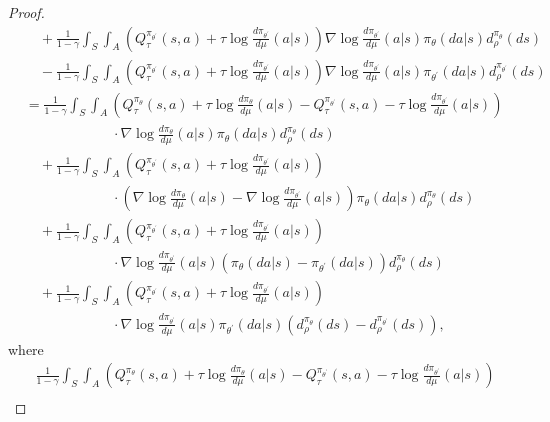 \documentclass{amsart}
\theoremstyle{definition}
\begin{document}
\begin{proof}
\begin{align}
& \quad + \frac{1}{1-\gamma}\int_{S} \int_{A} \left(Q^{\pi_{\theta^\prime}}_\tau(s,a) + \tau \log \frac{d \pi_{\theta^\prime}}{d \mu}(a|s)\right)  \nabla \log \frac{d\pi_{\theta^\prime}}{d \mu}(a| s)\pi_{\theta}(da|s)d_\rho^{\pi_{\theta}}(ds) \nonumber\\
& \quad - \frac{1}{1-\gamma}\int_{S} \int_{A} \left(Q^{\pi_{\theta^\prime}}_\tau(s,a) + \tau \log \frac{d \pi_{\theta^\prime}}{d \mu}(a|s)\right)  \nabla \log \frac{d\pi_{\theta^\prime}}{d \mu}(a| s)\pi_{\theta^\prime}(da|s)d_\rho^{\pi_{\theta^\prime}}(ds) \nonumber\\
& = \frac{1}{1-\gamma}\int_{S} \int_{A} \left(Q^{\pi_\theta}_\tau(s,a) + \tau \log \frac{d \pi_{\theta}}{d \mu}(a|s) - Q^{\pi_{\theta^\prime}}_\tau(s,a) - \tau \log \frac{d \pi_{\theta^\prime}}{d \mu}(a|s)\right) \nonumber \\
& \qquad \qquad \qquad \ \cdot\nabla \log \frac{d\pi_\theta}{d \mu}(a| s)\pi_{\theta}(da|s)d_\rho^{\pi_{\theta}}(ds) \nonumber \\
& \quad + \frac{1}{1-\gamma}\int_{S} \int_{A} \left(Q^{\pi_{\theta^\prime}}_\tau(s,a) + \tau \log \frac{d \pi_{\theta^\prime}}{d \mu}(a|s)\right) \nonumber \\
& \qquad \qquad \qquad \ \cdot\left(\nabla \log \frac{d\pi_{\theta}}{d \mu}(a| s) - \nabla \log \frac{d\pi_{\theta^\prime}}{d \mu}(a| s)\right)\pi_{\theta}(da|s)d_\rho^{\pi_{\theta}}(ds) \nonumber\\
& \quad + \frac{1}{1-\gamma}\int_{S} \int_{A} \left(Q^{\pi_{\theta^\prime}}_\tau(s,a) + \tau \log \frac{d \pi_{\theta^\prime}}{d \mu}(a|s)\right)  \nonumber \\
& \qquad \qquad \qquad \ \cdot \nabla \log \frac{d\pi_{\theta^\prime}}{d \mu}(a| s)\left(\pi_{\theta}(da|s) -\pi_{\theta^\prime}(da|s)\right)d_\rho^{\pi_{\theta}}(ds) \nonumber\\
& \quad + \frac{1}{1-\gamma}\int_{S} \int_{A} \left(Q^{\pi_{\theta^\prime}}_\tau(s,a) + \tau \log \frac{d \pi_{\theta^\prime}}{d \mu}(a|s)\right)  \nonumber \\
& \qquad \qquad \qquad \ \cdot
\nabla \log \frac{d\pi_{\theta^\prime}}{d \mu}(a| s)\pi_{\theta^\prime}(da|s)\left(d_\rho^{\pi_{\theta}}(ds)- d_\rho^{\pi_{\theta^\prime}}(ds)\right), \label{eq: difference of the derivative}
\end{align}
where 
\begin{align}
& \frac{1}{1-\gamma}\int_{S} \int_{A} \left(Q^{\pi_\theta}_\tau(s,a) + \tau \log \frac{d \pi_{\theta}}{d \mu}(a|s) - Q^{\pi_{\theta^\prime}}_\tau(s,a) - \tau \log \frac{d \pi_{\theta^\prime}}{d \mu}(a|s)\right) \nonumber \\

\end{align}
\end{proof}
\end{document}
